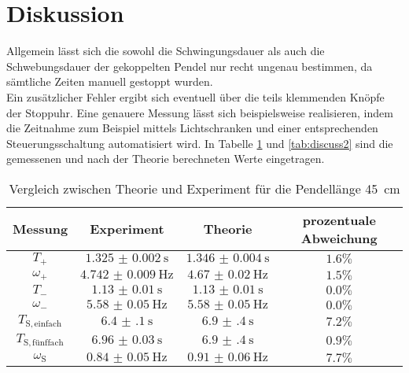 \section{Diskussion}
\label{sec:Diskussion}
Allgemein lässt sich die sowohl die Schwingungsdauer als auch die Schwebungsdauer der gekoppelten Pendel nur recht ungenau bestimmen, da sämtliche Zeiten manuell gestoppt wurden.\\
Ein zusätzlicher Fehler ergibt sich eventuell über die teils klemmenden Knöpfe der Stoppuhr.
Eine genauere Messung lässt sich beispielsweise realisieren, indem die Zeitnahme zum Beispiel mittels Lichtschranken und einer entsprechenden Steuerungsschaltung automatisiert wird.
In Tabelle \ref{tab:discuss} und \ref{tab:discuss2} sind die gemessenen und nach der Theorie
berechneten Werte eingetragen.

\begin{table}
	\caption{Vergleich zwischen Theorie und Experiment für die Pendellänge 45 \,\si{\centi\meter}}
	\label{tab:discuss}
	\begin{tabular}{cccc}
		\toprule
		Messung                    & Experiment               & Theorie                  & prozentuale Abweichung \\
		\midrule
		$T_{\mathrm{+}}$           & $\SI{1.325(2)}{\second}$ & $\SI{1.346(4)}{\second}$ & $1.6\%$                \\
		$\omega_{\mathrm{+}}$      & $\SI{4.742(9)}{\Hz}$     & $\SI{4.67(2)}{\Hz}$      & $1.5\%$                \\
		$T_{\mathrm{-}}$           & $\SI{1.13(1)}{\second}$  & $\SI{1.13(1)}{\second}$  & $0.0\% $               \\
		$\omega_{\mathrm{-}}$      & $\SI{5.58(5)}{\Hz}$      & $\SI{5.58(5)}{\Hz}$      & $0.0\%$                \\
		$T_{\mathrm{S,einfach}}$   & $\SI{6.4(1)}{\second}$   & $\SI{6.9(4)}{\second}$   & $7.2\%$                \\
		$T_{\mathrm{S,fünffach}}$ & $\SI{6.96(3)}{\second}$  & $\SI{6.9(4)}{\second}$   & $0.9\%$                \\
		$\omega_{\mathrm{S}}$      & $\SI{0.84(5)}{\Hz}$      & $\SI{0.91(6)}{\Hz}$      & $7.7\%$                \\
		\bottomrule
	\end{tabular}
\end{table}

